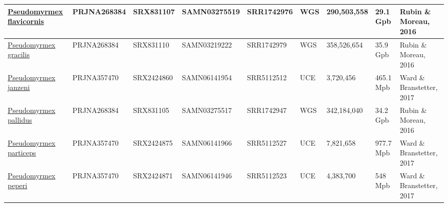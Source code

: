 \documentclass[../DISSERTACAO_MAIN.tex]{subfiles}
\begin{document}
\begin{landscape}
\begin{table}
{\begin{tabularx}{.9\linewidth}{| X | X | X | X | X | p{1.5cm} | X | p{1.5cm} | X |}
		\href{ftp://ftp.sra.ebi.ac.uk/vol1/srr/SRR174/006/SRR1742976}{Pseudomyrmex flavicornis} & PRJNA268384 & SRX831107 & SAMN03275519 & SRR1742976 & WGS & 290,503,558 & 29.1 Gpb & Rubin \& Moreau, 2016 \\ \hline

		\href{ftp://ftp.sra.ebi.ac.uk/vol1/srr/SRR174/009/SRR1742979}{Pseudomyrmex gracilis} & PRJNA268384 & SRX831110 & SAMN03219222 & SRR1742979 & WGS & 358,526,654 & 35.9 Gpb & Rubin \& Moreau, 2016 \\ \hline

		\href{ftp://ftp.sra.ebi.ac.uk/vol1/srr/SRR511/002/SRR5112512}{Pseudomyrmex janzeni} & PRJNA357470 & SRX2424860 & SAMN06141954 & SRR5112512 & UCE & 3,720,456 & 465.1 Mpb & Ward \& Branstetter, 2017 \\ \hline

		\href{ftp://ftp.sra.ebi.ac.uk/vol1/srr/SRR174/007/SRR1742947}{Pseudomyrmex pallidus} & PRJNA268384 & SRX831105 & SAMN03275517 & SRR1742947 & WGS & 342,184,040 & 34.2 Gpb & Rubin \& Moreau, 2016 \\ \hline

		\href{ftp://ftp.sra.ebi.ac.uk/vol1/srr/SRR511/007/SRR5112527}{Pseudomyrmex particeps} & PRJNA357470 & SRX2424875 & SAMN06141966 & SRR5112527 & UCE & 7,821,658 & 977.7 Mpb & Ward \& Branstetter, 2017 \\ \hline

		\href{ftp://ftp.sra.ebi.ac.uk/vol1/srr/SRR511/003/SRR5112523}{Pseudomyrmex peperi} & PRJNA357470 & SRX2424871 & SAMN06141946 & SRR5112523 & UCE & 4,383,700 & 548 Mpb & Ward \& Branstetter, 2017 \\ \hline

	\end{tabularx} }
	\label{tab:datasets}
	\end{table}
\end{landscape}
\end{document}
